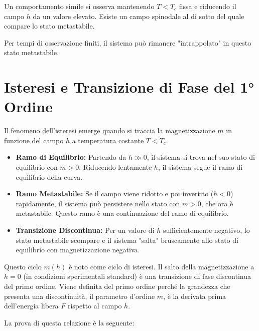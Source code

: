 Un comportamento simile si osserva mantenendo $T < T_c$ fissa e riducendo il campo $h$ da un valore elevato. Esiste un campo spinodale al di sotto del quale compare lo stato metastabile.

Per tempi di osservazione finiti, il sistema può rimanere "intrappolato" in questo stato metastabile.


\section{Isteresi e Transizione di Fase del 1° Ordine}
Il fenomeno dell'isteresi emerge quando si traccia la magnetizzazione $m$ in funzione del campo $h$ a temperatura costante $T < T_c$.

\begin{itemize}
    \item \textbf{Ramo di Equilibrio:} Partendo da $h \gg 0$, il sistema si trova nel suo stato di equilibrio con $m > 0$. Riducendo lentamente $h$, il sistema segue il ramo di equilibrio della curva.
    \item \textbf{Ramo Metastabile:} Se il campo viene ridotto e poi invertito ($h < 0$) rapidamente, il sistema può persistere nello stato con $m > 0$, che ora è metastabile. Questo ramo è una continuazione del ramo di equilibrio.
    \item \textbf{Transizione Discontinua:} Per un valore di $h$ sufficientemente negativo, lo stato metastabile scompare e il sistema "salta" bruscamente allo stato di equilibrio con magnetizzazione negativa.
\end{itemize}

Questo ciclo $m(h)$ è noto come ciclo di isteresi. Il salto della magnetizzazione a $h = 0$ (in condizioni sperimentali standard) è una transizione di fase discontinua del primo ordine.
Viene definita del primo ordine perché la grandezza che presenta una discontinuità, il parametro d'ordine $m$, è la derivata prima dell'energia libera $F$ rispetto al campo $h$.

\vspace{0.5cm}
\noindent{}
\vspace{0.5cm}

La prova di questa relazione è la seguente:

